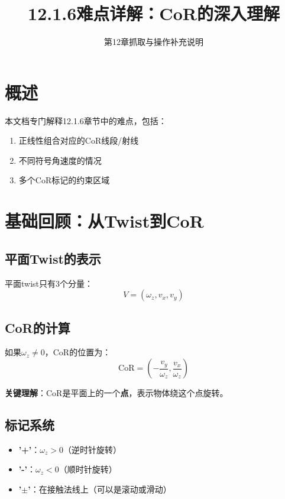 \documentclass[12pt,a4paper]{article}
\title{12.1.6难点详解：CoR的深入理解}
\author{第12章抓取与操作补充说明}
\date{}
\begin{document}
\maketitle

\section{概述}

本文档专门解释12.1.6章节中的难点，包括：
\begin{enumerate}
\item 正线性组合对应的CoR线段/射线
\item 不同符号角速度的情况
\item 多个CoR标记的约束区域
\end{enumerate}

\section{基础回顾：从Twist到CoR}

\subsection{平面Twist的表示}

平面twist只有3个分量：
\begin{equation}
V = (\omega_z, v_x, v_y)
\end{equation}

\subsection{CoR的计算}

如果$\omega_z \neq 0$，CoR的位置为：
\begin{equation}
\text{CoR} = \left(-\frac{v_y}{\omega_z}, \frac{v_x}{\omega_z}\right)
\end{equation}

\textbf{关键理解}：CoR是平面上的一个\textbf{点}，表示物体绕这个点旋转。

\subsection{标记系统}

\begin{itemize}
\item \textbf{'+'}：$\omega_z > 0$（逆时针旋转）
\item \textbf{'-'}：$\omega_z < 0$（顺时针旋转）
\item \textbf{'$\pm$'}：在接触法线上（可以是滚动或滑动）
\end{itemize}
\end{document}
